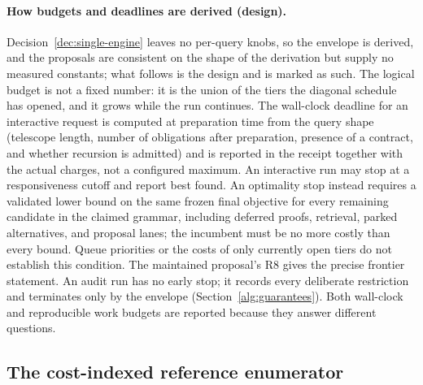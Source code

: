 \paragraph{How budgets and deadlines are derived (design).} Decision~\ref{dec:single-engine} leaves no per-query knobs, so the envelope is derived, and the proposals are consistent on the shape of the derivation but supply no measured constants; what follows is the design and is marked as such. The logical budget is not a fixed number: it is the union of the tiers the diagonal schedule has opened, and it grows while the run continues. The wall-clock deadline for an interactive request is computed at preparation time from the query shape (telescope length, number of obligations after preparation, presence of a contract, and whether recursion is admitted) and is reported in the receipt together with the actual charges, not a configured maximum. An interactive run may stop at a responsiveness cutoff and report best found. An optimality stop instead requires a validated lower bound on the same frozen final objective for every remaining candidate in the claimed grammar, including deferred proofs, retrieval, parked alternatives, and proposal lanes; the incumbent must be no more costly than every bound. Queue priorities or the costs of only currently open tiers do not establish this condition. The maintained proposal's R8 gives the precise frontier statement. An audit run has no early stop; it records every deliberate restriction and terminates only by the envelope (Section~\ref{alg:guarantees}). Both wall-clock and reproducible work budgets are reported because they answer different questions.

\subsection{The cost-indexed reference enumerator}\label{alg:enumerator}

